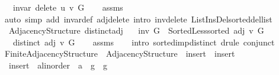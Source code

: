 \begin{isabellebody}
\ \ \ {\isachardoublequoteopen}invar\ {\isacharparenleft}{\kern0pt}delete\ u\ v\ G{\isacharparenright}{\kern0pt}{\isachardoublequoteclose}%
\endisataginvisible
{\isafoldinvisible}%
%
\isadeliminvisible
\isanewline
%
\endisadeliminvisible
%
\isadelimproof
\ \ %
\endisadelimproof
%
\isatagproof
{}\isamarkupfalse%
\ assms\isanewline
\ \ \isamarkupfalse%
\ {\isacharparenleft}{\kern0pt}auto\ simp\ add{\isacharcolon}{\kern0pt}\ invar{\isacharunderscore}{\kern0pt}def\ adj{\isacharunderscore}{\kern0pt}delete\ intro{\isacharcolon}{\kern0pt}\ inv{\isacharunderscore}{\kern0pt}delete\ List{\isacharunderscore}{\kern0pt}Ins{\isacharunderscore}{\kern0pt}Del{\isachardot}{\kern0pt}sorted{\isacharunderscore}{\kern0pt}del{\isacharunderscore}{\kern0pt}list{\isacharparenright}{\kern0pt}%
\endisatagproof
{\isafoldproof}%
%
\isadelimproof
\isanewline
%
\endisadelimproof
%
\isadeliminvisible
\isanewline
%
\endisadeliminvisible
%
\isataginvisible
{}\isamarkupfalse%
\ {\isacharparenleft}{\kern0pt}\ Adjacency{\isacharunderscore}{\kern0pt}Structure{\isacharparenright}{\kern0pt}\ distinct{\isacharunderscore}{\kern0pt}adj{\isacharcolon}{\kern0pt}\isanewline
\ \ \ {\isachardoublequoteopen}inv\ G\ {\isasymand}\ Sorted{\isacharunderscore}{\kern0pt}Less{\isachardot}{\kern0pt}sorted\ {\isacharparenleft}{\kern0pt}adj\ v\ G{\isacharparenright}{\kern0pt}{\isachardoublequoteclose}\isanewline
\ \ \ {\isachardoublequoteopen}distinct\ {\isacharparenleft}{\kern0pt}adj\ v\ G{\isacharparenright}{\kern0pt}{\isachardoublequoteclose}%
\endisataginvisible
{\isafoldinvisible}%
%
\isadeliminvisible
\isanewline
%
\endisadeliminvisible
%
\isadelimproof
\ \ %
\endisadelimproof
%
\isatagproof
{}\isamarkupfalse%
\ assms\isanewline
\ \ \isamarkupfalse%
\ {\isacharparenleft}{\kern0pt}intro\ sorted{\isacharunderscore}{\kern0pt}imp{\isacharunderscore}{\kern0pt}distinct{\isacharparenright}{\kern0pt}\ {\isacharparenleft}{\kern0pt}drule\ conjunct{}{\isacharparenright}{\kern0pt}%
\endisatagproof
{\isafoldproof}%
%
\isadelimproof
\isanewline
%
\endisadelimproof
\isanewline
{}\isamarkupfalse%
\ Finite{\isacharunderscore}{\kern0pt}Adjacency{\isacharunderscore}{\kern0pt}Structure\ {\isacharequal}{\kern0pt}\ Adjacency{\isacharunderscore}{\kern0pt}Structure\ \ insert\ {\isacharequal}{\kern0pt}\ insert\ \isanewline
\ \ insert\ {\isacharcolon}{\kern0pt}{\isacharcolon}{\kern0pt}\ {\isachardoublequoteopen}{\isacharprime}{\kern0pt}a{\isacharcolon}{\kern0pt}{\isacharcolon}{\kern0pt}linorder\ {\isasymRightarrow}\ {\isacharprime}{\kern0pt}a\ {\isasymRightarrow}\ {\isacharprime}{\kern0pt}g\ {\isasymRightarrow}\ {\isacharprime}{\kern0pt}g{\isachardoublequoteclose}\ {\isacharplus}{\kern0pt}\isanewline

\end{isabellebody}
